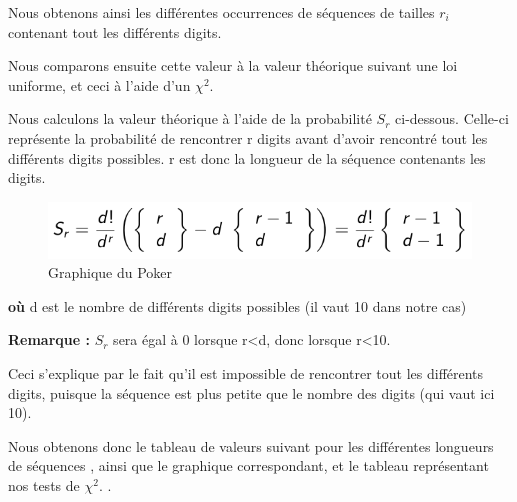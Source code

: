 \documentclass[10pt,a4paper]{article}
\begin{document}
Nous obtenons ainsi les différentes occurrences de séquences de tailles $r_i$ contenant tout les différents digits.

Nous comparons ensuite cette valeur à la valeur théorique suivant une loi uniforme, et ceci à l'aide d'un $\chi^2$.

Nous calculons la valeur théorique à l'aide de la probabilité $ S_r$ ci-dessous. Celle-ci représente la probabilité de rencontrer r digits avant d'avoir rencontré tout les différents digits possibles. r est donc la longueur de la séquence contenants les digits.

\begin{figure}[h]
		\centering
\includegraphics[scale=0.4]{images/formule.png}  
\caption{Graphique du Poker}
	\end{figure}

\textbf{où} d est le nombre de différents digits possibles (il vaut 10 dans notre cas)

\textbf{Remarque :} $S_r$ sera égal à 0 lorsque r<d, donc lorsque r<10.

 

Ceci s'explique par le fait qu'il est impossible de rencontrer tout les différents digits, puisque la séquence est plus petite que le nombre des digits (qui vaut ici 10). 

Nous obtenons donc le tableau de valeurs suivant pour les différentes longueurs de séquences , ainsi que le graphique correspondant, et le tableau représentant nos tests de $\chi^2$. .

\newpage
\end{document}
